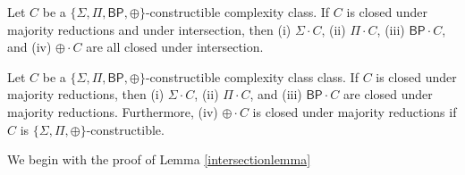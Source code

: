 \documentclass[11pt]{article}
\newcommand{\bp}{\textsf{BP}}
\newcommand{\parity}{\oplus}
\begin{document}
\begin{lemma}\label{intersectionlemma}
Let $C$ be a \emph{$\{\Sigma,\Pi,\bp,\parity\}$}-constructible complexity class. If $C$ is closed under majority reductions and under intersection, then (i) \emph{$\Sigma \cdot C$}, (ii) \emph{$\Pi \cdot C$}, (iii) \emph{$\bp \cdot C$}, and (iv) \emph{$\parity \cdot C$} are all closed under intersection.
\end{lemma}

\begin{lemma}\label{amplifymainlemma}
Let $C$ be a \emph{$\{\Sigma,\Pi,\bp,\parity\}$}-constructible complexity class class. If $C$ is closed under majority reductions, then (i) \emph{$\Sigma \cdot C$}, (ii) \emph{$\Pi \cdot C$}, and (iii) \emph{$\bp \cdot C$} are closed under majority reductions. Furthermore, (iv) \emph{$\parity \cdot C$} is closed under majority reductions if $C$ is $\{\Sigma, \Pi, \parity\}$-constructible.
\end{lemma}
We begin with the proof of Lemma \ref{intersectionlemma}
\end{document}
